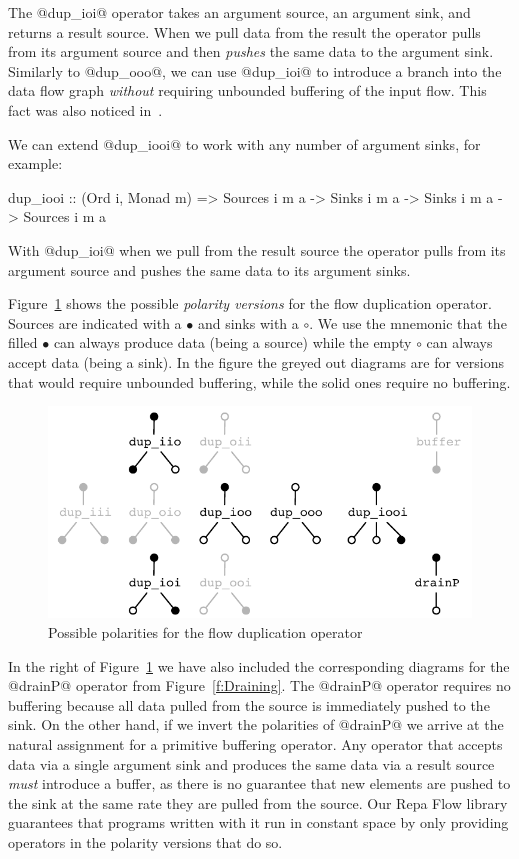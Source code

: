 The @dup_ioi@ operator takes an argument source, an argument sink, and returns a result source. When we pull data from the result the operator pulls from its argument source and then \emph{pushes} the same data to the argument sink. Similarly to @dup_ooo@, we can use @dup_ioi@ to introduce a branch into the data flow graph \emph{without} requiring unbounded buffering of the input flow. This fact was also noticed in~\cite{Bernardy:Duality}.

\eject
We can extend @dup_iooi@ to work with any number of argument sinks, for example:
\begin{code}
 dup_iooi
  :: (Ord i, Monad m)
  => Sources i m a -> Sinks i m a -> Sinks i m a
  -> Sources i m a
\end{code}

With @dup_ioi@ when we pull from the result source the operator pulls from its argument source and pushes the same data to its argument sinks. 

Figure~\ref{f:Polarity} shows the possible \emph{polarity versions} for the flow duplication operator. Sources are indicated with a $\bullet$ and sinks with a $\circ$. We use the mnemonic that the filled $\bullet$ can always produce data (being a source) while the empty $\circ$ can always accept data (being a sink). In the figure the greyed out diagrams are for versions that would require unbounded buffering, while the solid ones require no buffering.

\begin{figure}
\includegraphics[scale=0.7]{figures/polarity.pdf}

\caption{Possible polarities for the flow duplication operator}
\label{f:Polarity}
\end{figure}

In the right of Figure~\ref{f:Polarity} we have also included the corresponding diagrams for the @drainP@ operator from Figure~\ref{f:Draining}. The @drainP@ operator requires no buffering because all data pulled from the source is immediately pushed to the sink. On the other hand, if we invert the polarities of @drainP@ we arrive at the natural assignment for a primitive buffering operator. Any operator that accepts data via a single argument sink and produces the same data via a result source \emph{must} introduce a buffer, as there is no guarantee that new elements are pushed to the sink at the same rate they are pulled from the source. Our Repa Flow library guarantees that programs written with it run in constant space by only providing operators in the polarity versions that do so.


